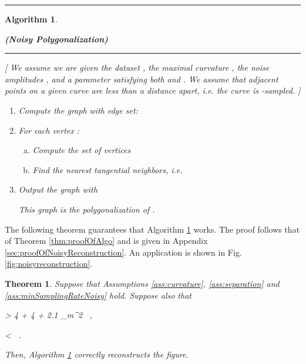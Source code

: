 \documentclass{article}
\newtheorem{theorem}[cntr]{Theorem}
\newtheorem{algo}{Algorithm}
\numberwithin{cntr}{section}
\numberwithin{equation}{section}
\newcommand{\curvemax}{{\kappa_{m}}}
\newcommand{\curvesep}{{\delta}}
\newcommand{\pointNoise}{{\zeta}}
\newcommand{\tanNoise}{{\xi}}
\begin{document}
\hrule
\begin{algo}
  \label{algo:polygonalizationNoisy}
  \begin{center} {\bf (Noisy Polygonalization)}
  \end{center}

\vspace{.1in}

\hrule

\vspace{.2in}

[ We assume we are given the dataset , the maximal curvature
, the noise amplitudes , and a
parameter  satisfying both  and
. We assume that adjacent points on a given curve
are less than a distance  apart, i.e. the curve is
-sampled. ]

\vspace{.1in}

\begin{enumerate}
  \item Compute the graph  with edge set:
    
  \item For each vertex :
    \begin{enumerate}[a.]
    \item Compute the set of vertices
      
    \item Find the nearest tangential neighbors, i.e.
      
    \end{enumerate}
  \item Output the graph  with
    
    This graph is the polygonalization of .
  \end{enumerate}

\end{algo}

The following theorem
guarantees that Algorithm \ref{algo:polygonalizationNoisy} works.
The proof follows that of Theorem \ref{thm:proofOfAlgo}
and is given in Appendix \ref{sec:proofOfNoisyReconstruction}.
An application is shown in Fig. \ref{fig:noisyreconstruction}.

\begin{theorem}
  \label{thm:noisyReconstruction}
  Suppose that Assumptions \ref{ass:curvature}, \ref{ass:separation} and \ref{ass:minSamplingRateNoisy} hold. Suppose also that
  
      \label{eq:noisySeparationDistance}
      \curvesep > 4 \pointNoise + 4 \epsilon \tanNoise + 2.1 \curvemax \epsilon^{2} \, ,
    
      \label{eq:noisyConstraintOnkmaxEpsilon}
      \epsilon < \frac{1}{ \curvemax \sqrt{2}} \, .
    
  Then, Algorithm \ref{algo:polygonalizationNoisy} correctly reconstructs
the figure.
\end{theorem}
\end{document}
